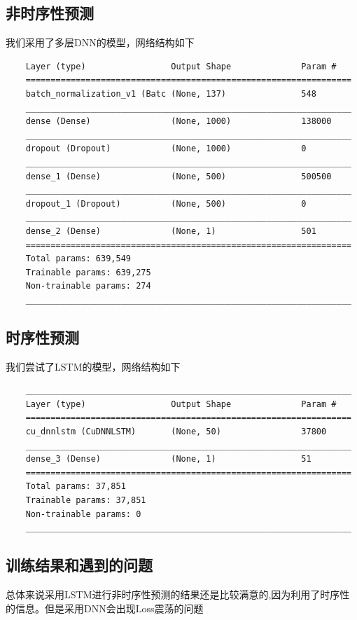 \documentclass[UTF8]{ctexart}
\begin{document}
\subsection{非时序性预测}
我们采用了多层DNN的模型，网络结构如下
\begin{verbatim}
    Layer (type)                 Output Shape              Param #   
    =================================================================
    batch_normalization_v1 (Batc (None, 137)               548       
    _________________________________________________________________
    dense (Dense)                (None, 1000)              138000    
    _________________________________________________________________
    dropout (Dropout)            (None, 1000)              0         
    _________________________________________________________________
    dense_1 (Dense)              (None, 500)               500500    
    _________________________________________________________________
    dropout_1 (Dropout)          (None, 500)               0         
    _________________________________________________________________
    dense_2 (Dense)              (None, 1)                 501       
    =================================================================
    Total params: 639,549
    Trainable params: 639,275
    Non-trainable params: 274
    _________________________________________________________________

\end{verbatim}
\subsection{时序性预测}
我们尝试了LSTM的模型，网络结构如下
\begin{verbatim}
    _________________________________________________________________
    Layer (type)                 Output Shape              Param #   
    =================================================================
    cu_dnnlstm (CuDNNLSTM)       (None, 50)                37800     
    _________________________________________________________________
    dense_3 (Dense)              (None, 1)                 51        
    =================================================================
    Total params: 37,851
    Trainable params: 37,851
    Non-trainable params: 0
    _________________________________________________________________
\end{verbatim}
\subsection{训练结果和遇到的问题}
总体来说采用LSTM进行非时序性预测的结果还是比较满意的,因为利用了时序性的信息。但是采用DNN会出现Loss震荡的问题
\end{document}

